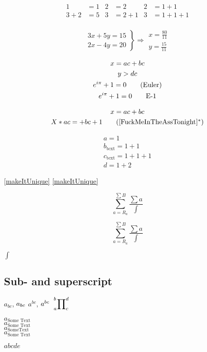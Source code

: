 \documentclass[a4paper]{article}
\begin{document}
    \begin{align}
        1&=1&2&=2&2&=1+1\\
        3+2&=5&3&=2+1&3&=1+1+1\\
    \end{align}

    \[
    \left.
    \begin{aligned}
        3x+5y=15\\
        2x-4y=20
    \end{aligned}\right\} \Longrightarrow
    \begin{aligned}
        x=\frac{80}{11}\\
        y=\frac{15}{11}
    \end{aligned}
    \]

    \begin{gather}
        x=ac+bc\\
        y>dc\notag\\
        e^{i\pi}+1=0\tag{Euler}\\
        e^{i\pi}+1=0\tag*{E-1}
    \end{gather}

    \begin{gather}
        x=ac+bc\label{FuckMeInTheAssTonight}\\
        X*ac=+bc+1\tag{\ref{FuckMeInTheAssTonight}$^*$}
    \end{gather}

    \begin{subequations}
        \begin{eqnarray}
            a=1\label{makeItUnique}\\
            b_{\mbox{text}}=1+1\\
            c_{\text{text}}=1+1+1\\
            d=1+2
        \end{eqnarray}
    \end{subequations}

    \ref{makeItUnique}
    \eqref{makeItUnique}

    \[
    \sum_{a=R_a}^{\sum B}\frac{\sum a}{\int}
    \]

    \[
    \textstyle\sum_{a=R_a}^{\displaystyle\sum B}\frac{\scriptscriptstyle\sum a}{\scriptstyle\int}
    \]

    $\displaystyle\int$

    \subsection{Sub- and superscript}
    $a_{bc}$, $a\sb{bc}$
    $a^{bc}$, $a\sp{bc}$
    $\sideset{_a^b}{_c^d}\prod$

    $a_{\text{Some Text}}$\\
    $a_{\mbox{Some Text}}$\\
    $a_{\mathrm{Some Text}}$\\
    $a_{\textrm{Some Text}}$

    $a b c d e$
\end{document}
